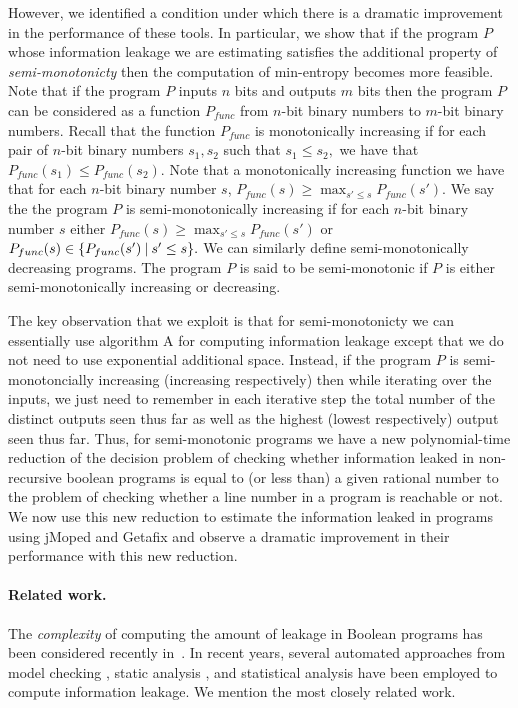 However, we  identified a condition under which there is a dramatic improvement in the performance of these tools. In particular, we show that if the program $P$ whose information leakage we are estimating satisfies the additional property of \emph{semi-monotonicty} then the computation of min-entropy becomes more feasible. Note that  
  if the program $P$ inputs $n$ bits and outputs $m$ bits then the program $P$ can be considered as  a function $P_{func}$ from $n$-bit binary numbers to $m$-bit binary numbers. Recall that the function $P_{func}$ is monotonically increasing  if  for each pair of $n$-bit  binary numbers $s_1, s_2$  such that  $s_1\leq s_2,$ we have that $P_{func}(s_1) \leq P_{func}(s_2).$ Note that a monotonically increasing  function we have that for each $n$-bit binary number $s$, $P_{func}(s) \geq \max_{ s'\leq s} {P_{func}(s')}.$
    We say the the program $P$ is semi-monotonically increasing if for each $n$-bit  binary number $s$ either $P_{func}(s) \geq \max_{ s'\leq s}{P_{func}(s')}$ or $P_{func}(s) \in \{ P_{func}(s') \mathbin{|} s'\leq s \}.$ We can similarly define semi-monotonically decreasing programs. The program $P$ is said to be semi-monotonic if $P$ is either 
    semi-monotonically increasing or decreasing. 

The key observation that we exploit is that for semi-monotonicty we can essentially use algorithm A for computing information leakage except that we do not need to use exponential additional space. Instead, if the program $P$ is semi-monotoncially increasing (increasing respectively) then while iterating over the inputs,  we just need to remember in each iterative step  the total number of the distinct outputs seen thus far as well as the highest  (lowest respectively) output seen thus far. Thus, for semi-monotonic programs we have a new polynomial-time reduction of the decision problem of checking whether information leaked  in non-recursive boolean programs is  equal to (or less than) a given rational number to the problem of checking whether a line number in a program is reachable or not.  We now use this new reduction to estimate the information leaked in programs using jMoped and Getafix and  observe a dramatic improvement in their performance with this new reduction.



  
 
%
\paragraph{Related work.}
\label{sec:related}
The \emph{complexity} of computing the amount of leakage in Boolean programs has been   considered recently in~\cite{Jp1,Jp2,Jp3,Krish,rch:mu:fsttcs2012,Krish,POST}. 
In recent years, several automated approaches from model checking \cite{BackesKopf,Kopf,Kostas07,Kostas08}, static analysis \cite{clark94,clark05,clark07,BackesKopf}, and statistical analysis \cite{Kopf,Chothia}  have been employed to compute information leakage. We mention the most closely related work.


